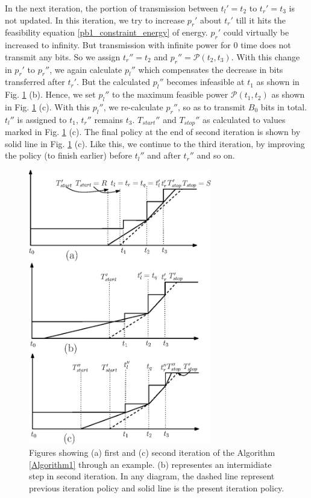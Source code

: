 In the next iteration, the portion of transmission between $t_l'=t_2$ to $t_r'=t_3$ is not updated. In this iteration, we try to increase $p_r'$ about $t_r'$ till it hits the feasibility equation \eqref{pb1_constraint_energy} of energy. $p_r'$ could virtually be increased to infinity. But transmission with infinite power for 0 time does not transmit any bits. So we assign $t_r''=t_2$ and $p_r''=\mathcal{P}(t_2,t_3)$. With this change in $p_r'$ to $p_r''$, we again calculate $p_l''$ which compensates the decrease in bits transferred after $t_r'$. But the calculated $p_l''$ becomes infeasible at $t_1$ as shown in Fig. \ref{figure_example_Algorithm1} (b). Hence, we set $p_l''$ to the maximum feasible power $\mathcal{P}(t_1,t_2)$ as shown in Fig. \ref{figure_example_Algorithm1} (c). With this $p_l''$, we re-calculate $p_r''$, so as to transmit $B_0$ bits in total. $t_l''$ is assigned to $t_1$, $t_r''$ remains $t_3$. $T_{start}''$ and $T_{stop}''$ as calculated to values marked in Fig. \ref{figure_example_Algorithm1} (c). The final policy at the end of second iteration is shown by solid line in Fig. \ref{figure_example_Algorithm1} (c). Like this, we continue to the third iteration, by improving the policy (to finish earlier) before $t_l''$ and after $t_r''$ and so on.


\begin{figure}
\centering
  \centerline{\includegraphics[width=8cm]{example_algo1.eps}}
\caption{Figures showing (a) first  and (c) second iteration of the Algorithm \ref{Algorithm1} through an example. (b) representes an intermidiate step in second iteration. In any diagram, the dashed line represent previous iteration policy and solid line is the present iteration policy.}\label{figure_example_Algorithm1}
\end{figure}


